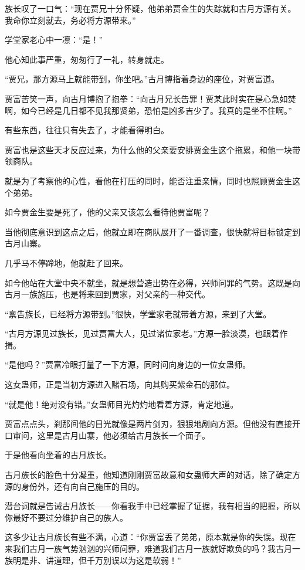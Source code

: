 \begin{this_body}
族长叹了一口气：“现在贾兄十分怀疑，他弟弟贾金生的失踪就和古月方源有关。我命你立刻就去，务必将方源带来。”

学堂家老心中一凛：“是！”

他心知此事严重，匆匆行了一礼，转身就走。

“贾兄，那方源马上就能带到，你坐吧。”古月博指着身边的座位，对贾富道。

贾富苦笑一声，向古月博抱了抱拳：“向古月兄长告罪！贾某此时实在是心急如焚啊，如今已经是几日都不见我那贤弟，恐怕是凶多吉少了。我真的是坐不住啊。”

有些东西，往往只有失去了，才能看得明白。

贾富也是这些天才反应过来，为什么他的父亲要安排贾金生这个拖累，和他一块带领商队。

就是为了考察他的心性，看他在打压的同时，能否注重亲情，同时也照顾贾金生这个弟弟。

如今贾金生要是死了，他的父亲又该怎么看待他贾富呢？

当他彻底意识到这点之后，他就立即在商队展开了一番调查，很快就将目标锁定到古月山寨。

几乎马不停蹄地，他就赶了回来。

如今他站在大堂中央不就坐，就是想营造出势在必得，兴师问罪的气势。这既是向古月一族施压，也是将来回到贾家，对父亲的一种交代。

“禀告族长，已经将方源带到。”很快，学堂家老就带着方源，来到了大堂。

“古月方源见过族长，见过贾富大人，见过诸位家老。”方源一脸淡漠，也跟着作揖。

“是他吗？”贾富冷眼打量了一下方源，同时问向身边的一位女蛊师。

这女蛊师，正是当初方源进入赌石场，向其购买紫金石的那位。

“就是他！绝对没有错。”女蛊师目光灼灼地看着方源，肯定地道。

贾富点点头，刹那间他的目光就像是两片剑刃，狠狠地剐向方源。但他没有直接开口审问，这里是古月山寨，他必须给古月族长一个面子。

于是他看向坐着的古月族长。

古月族长的脸色十分凝重，他知道刚刚贾富故意和女蛊师大声的对话，除了确定方源的身份外，还有向自己施压的目的。

潜台词就是告诫古月族长——你看我手中已经掌握了证据，我有相当的把握，所以你最好不要过分维护自己的族人。

这多少让古月族长有些不满，心道：“你贾富丢了弟弟，原本就是你的失误。现在来我们古月一族气势汹汹的兴师问罪，难道我们古月一族就好欺负的吗？我古月一族明是非、讲道理，但千万别误以为这是软弱！”


\end{this_body}
